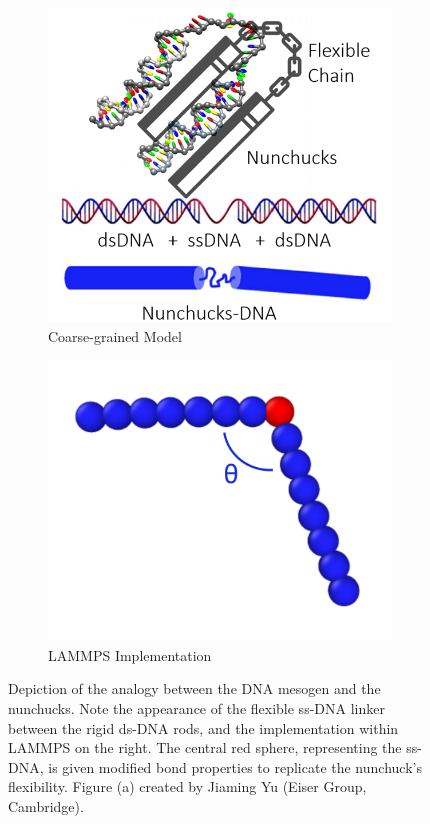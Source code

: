 \documentclass[11pt, a4paper]{article} %
\begin{document}
\begin{figure}[ht]
	\hfill  %
	\begin{subfigure}{.4\textwidth}
		\centering
		\includegraphics[width=\linewidth]{Figures/nunchucks_artist}  
		\caption{Coarse-grained Model}
		\label{fig:nunchuck_analogy}
	\end{subfigure}
	\hfill %
	\begin{subfigure}{.4\textwidth}
		\centering
		\includegraphics[width=\linewidth]{Figures/nunchuck_profile_coloured}  
		\caption{LAMMPS Implementation}
		\label{fig:nunchuck_implementation}
	\end{subfigure}
	\caption{Depiction of the analogy between the DNA mesogen and the nunchucks. Note the appearance of the flexible ss-DNA linker between the rigid ds-DNA rods, and the implementation within LAMMPS on the right. The central red sphere, representing the ss-DNA, is given modified bond properties to replicate the nunchuck's flexibility. Figure (a) created by Jiaming Yu (Eiser Group, Cambridge).}
	\label{fig:nunchucks_visual}
	\hfill
\end{figure}
\end{document}
